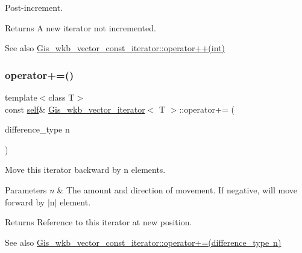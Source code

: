Post-\/increment. 

\begin{DoxyReturn}{Returns}
A new iterator not incremented. 
\end{DoxyReturn}
\begin{DoxySeeAlso}{See also}
\mbox{\hyperlink{classGis__wkb__vector__const__iterator_a82e26fad2ec2115454fbfeb90675f42c}{Gis\+\_\+wkb\+\_\+vector\+\_\+const\+\_\+iterator\+::operator++(int)}} 
\end{DoxySeeAlso}
\mbox{\label{classGis__wkb__vector__iterator_a79abfc33a88bf7e7a5c2eb202b0ffcc0}} 
\subsubsection{\texorpdfstring{operator+=()}{operator+=()}}
{\footnotesize\ttfamily template$<$class T$>$ \\
const \mbox{\hyperlink{classGis__wkb__vector__const__iterator}{self}}\& \mbox{\hyperlink{classGis__wkb__vector__iterator}{Gis\+\_\+wkb\+\_\+vector\+\_\+iterator}}$<$ T $>$\+::operator+= (\begin{DoxyParamCaption}\item[{difference\+\_\+type}]{n }\end{DoxyParamCaption})\hspace{0.3cm}{\ttfamily [inline]}}



Move this iterator backward by n elements. 


\begin{DoxyParams}{Parameters}
{\em n} & The amount and direction of movement. If negative, will move forward by $\vert$n$\vert$ element. \\
\hline
\end{DoxyParams}
\begin{DoxyReturn}{Returns}
Reference to this iterator at new position. 
\end{DoxyReturn}
\begin{DoxySeeAlso}{See also}
\mbox{\hyperlink{classGis__wkb__vector__const__iterator_a1b985aee8037b4fbe3aed2359f95dd57}{Gis\+\_\+wkb\+\_\+vector\+\_\+const\+\_\+iterator\+::operator+=(difference\+\_\+type n)}} 
\end{DoxySeeAlso}
\mbox{\label{classGis__wkb__vector__iterator_a1a8a11a01a931641143844a3075ca41f}} 
